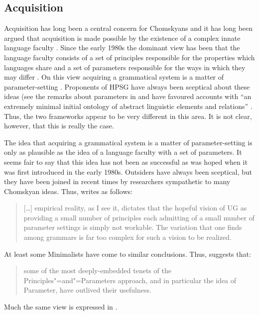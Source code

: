 \documentclass[output=paper]{langsci/langscibook}
\begin{document}
\subsection{Acquisition}

Acquisition has long been a central concern for Chomskyans and it has long been argued that
acquisition is made possible by the existence of a complex innate language faculty \citep[Section~I.8]{Chomsky65a}. Since the early
1980s the dominant view has been that the language faculty consists of a set of principles
responsible for the properties which languages share and a set of parameters responsible for the ways in
which they may differ \citep[]{Chomsky81a}. On this view acquiring a grammatical system is a matter of
parameter-setting \citep[]{Chomsky2000a-u}. Proponents of HPSG have always been sceptical about these ideas (see \eg the
remarks about parameters in  and have favoured accounts with ``an extremely
minimal initial ontology of abstract linguistic elements and relations'' \citep[]{Green2011a}. Thus, the
two frameworks appear to be very different in this area. It is not clear, however, that this is
really the case.

The idea that acquiring a grammatical system is a matter of parameter-setting is only as plausible
as the idea of a language faculty with a set of parameters. It seems fair to say that this idea has
not been as successful as was hoped when it was first introduced in the early 1980s.  Outsiders have
always been sceptical, but they have been joined in recent times by researchers sympathetic to many
Chomskyan ideas. Thus, \citet[]{Newmeyer2005a} writes as follows:

\begin{quotation}
[\ldots] empirical reality, as I see it, dictates that the hopeful vision of UG as providing a small
number of principles each admitting of a small number of parameter settings is simply not
workable. The variation that one finds among grammars is far too complex for such a vision to be
realized.
\end{quotation}
%
At least some Minimalists have come to similar conclusions. Thus, \citet[]{Boeckx2011a-u} suggests that:
\begin{quotation}
some of the most deeply-embedded tenets of the Principles"=and"=Parameters approach, and in particular
the idea of Parameter, have outlived their usefulness. \citep[]{Boeckx2011a-u}
\end{quotation}
%
Much the same view is expressed in .
\end{document}
